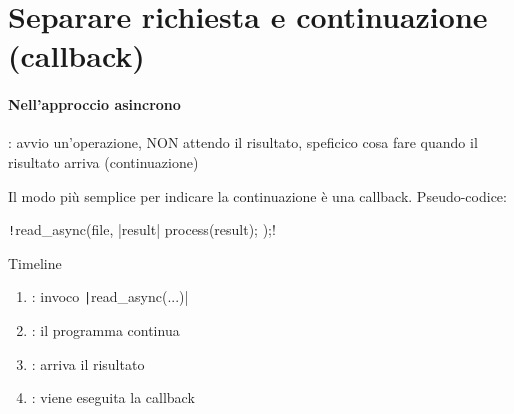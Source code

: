 


\section{Separare richiesta e continuazione (callback)}

\paragraph{Nell'approccio asincrono}: avvio un'operazione, NON attendo il risultato, speficico cosa fare quando il risultato arriva (continuazione)

Il modo più semplice per indicare la continuazione è una callback. Pseudo-codice:

\texttt!read_async(file, |result| { process(result); });!

Timeline

\begin{enumerate}
  \item[\textit{$t_0$}]: invoco \texttt|read_async(...)|
  \item[\textit{$t_1$}]: il programma continua
  \item[\textit{$t_2$}]: arriva il risultato
  \item[\textit{$t_3$}]: viene eseguita la callback
\end{enumerate}

